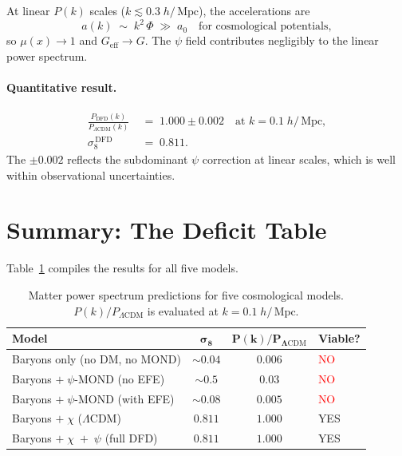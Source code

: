 \documentclass[12pt,a4paper]{article}
\newcommand{\Mpc}{\,\mathrm{Mpc}}
\newcommand{\LCDM}{\Lambda\mathrm{CDM}}
\newcommand{\Geff}{G_{\mathrm{eff}}}
\newcommand{\azero}{a_0}
\begin{document}
At linear $P(k)$ scales ($k \lesssim 0.3\;h/\Mpc$), the accelerations
are
\begin{equation}
  a(k) \;\sim\; k^2\,\Phi \;\gg\; \azero
  \quad\text{for cosmological potentials},
\end{equation}
so $\mu(x) \to 1$ and $\Geff \to G$. The $\psi$ field contributes
negligibly to the linear power spectrum.

\paragraph{Quantitative result.}
\begin{align}
  \frac{P_{\mathrm{DFD}}(k)}{P_{\LCDM}(k)}
  &\;=\; 1.000 \pm 0.002
  \quad\text{at } k = 0.1\;h/\Mpc, \\[4pt]
  \sigma_8^{\,\mathrm{DFD}} &\;=\; 0.811.
\end{align}
The $\pm 0.002$ reflects the subdominant $\psi$ correction at linear
scales, which is well within observational uncertainties.

\section{Summary: The Deficit Table}
\label{sec:deficit_table}

Table~\ref{tab:deficit} compiles the results for all five models.

\begin{table}[htbp]
\centering
\caption{Matter power spectrum predictions for five cosmological models.
$P(k)/P_{\LCDM}$ is evaluated at $k = 0.1\;h/\Mpc$.}
\label{tab:deficit}
\begin{tabular}{@{}lccl@{}}
\toprule
\textbf{Model} & $\boldsymbol{\sigma_8}$ &
  $\boldsymbol{P(k)/P_{\LCDM}}$ & \textbf{Viable?} \\
\midrule
Baryons only (no DM, no MOND)
  & $\sim\!0.04$ & $0.006$ & \textcolor{red}{NO} \\[3pt]
Baryons $+\;\psi$-MOND (no EFE)
  & $\sim\!0.5$ & $0.03$ & \textcolor{red}{NO} \\[3pt]
Baryons $+\;\psi$-MOND (with EFE)
  & $\sim\!0.08$ & $0.005$ & \textcolor{red}{NO} \\[3pt]
Baryons $+\;\chi$ ($\LCDM$)
  & $0.811$ & $1.000$ & \textcolor{green!50!black}{YES} \\[3pt]
Baryons $+\;\chi\;+\;\psi$ (full DFD)
  & $0.811$ & $1.000$ & \textcolor{green!50!black}{YES} \\
\bottomrule
\end{tabular}
\end{table}
\end{document}
